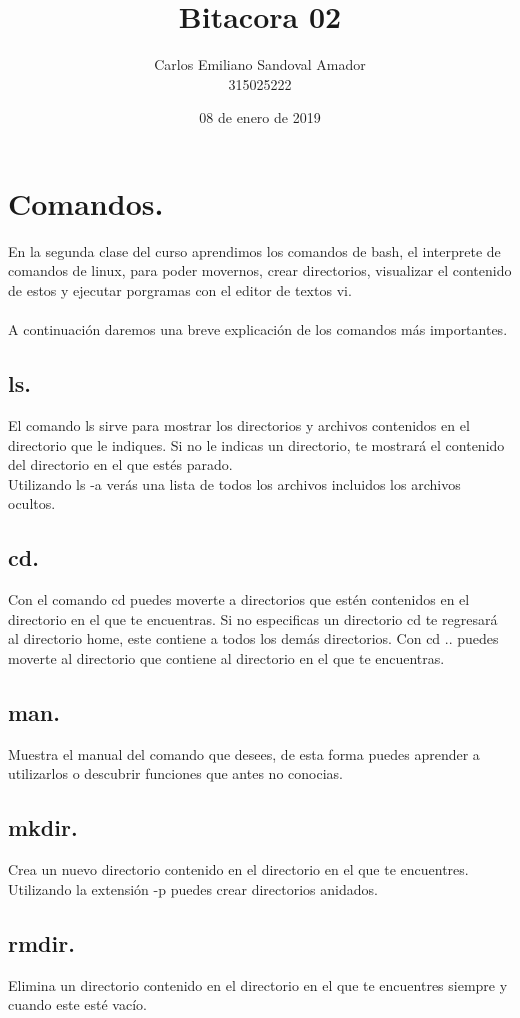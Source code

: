 \documentclass[letterpaper, 12pt, oneside]{article}%
\title{Bitacora 02}
\author{Carlos Emiliano Sandoval Amador \\ 315025222}
\date{08 de enero de 2019}
\begin{document}
	\maketitle
	\section{Comandos.}
	{En la segunda clase del curso aprendimos los comandos de bash, el interprete de comandos de linux, para poder movernos, crear directorios, visualizar el contenido de estos y ejecutar porgramas con el editor de textos vi.\\ \\ A continuación daremos una breve explicación de los comandos más importantes.\\}
	\subsection{ls.}
	{El comando ls sirve para mostrar los directorios y archivos contenidos en el directorio que le indiques. Si no le indicas un directorio, te mostrará el contenido del directorio en el que estés parado. \\ Utilizando ls -a verás una lista de todos los archivos incluidos los archivos ocultos.}
	\subsection{cd.}
	{Con el comando cd puedes moverte a directorios que estén contenidos en el directorio en el que te encuentras. Si no especificas un directorio cd te regresará al directorio home, este contiene a todos los demás directorios. Con cd .. puedes moverte al directorio que contiene al directorio en el que te encuentras.}
	\subsection{man.}
	{Muestra el manual del comando que desees, de esta forma puedes aprender a utilizarlos o descubrir funciones que antes no conocias.}
	\subsection{mkdir.}
	{Crea un nuevo directorio contenido en el directorio en el que te encuentres. Utilizando la extensión -p puedes crear directorios anidados.}
	\subsection{rmdir.}
	{Elimina un directorio contenido en el directorio en el que te encuentres siempre y cuando este esté vacío.}
\end{document}
